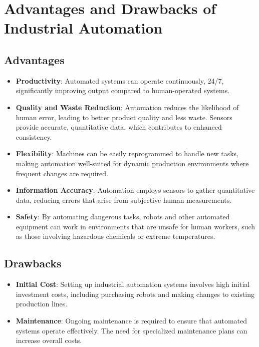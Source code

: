 \documentclass[
  14pt,
  a4paper,
  numbers=noendperiod,
  headinclude=true,
  footinclude=true,
  DIV=calc]{scrreprt}
\providecommand{\tightlist}{%
  \setlength{\itemsep}{0pt}\setlength{\parskip}{0pt}}\usepackage{longtable,booktabs,array}
\begin{document}
\section{Advantages and Drawbacks of Industrial
Automation}\label{advantages-and-drawbacks-of-industrial-automation}

\subsection{Advantages}\label{advantages}

\begin{itemize}
\tightlist
\item
  \textbf{Productivity}: Automated systems can operate continuously,
  24/7, significantly improving output compared to human-operated
  systems.
\item
  \textbf{Quality and Waste Reduction}: Automation reduces the
  likelihood of human error, leading to better product quality and less
  waste. Sensors provide accurate, quantitative data, which contributes
  to enhanced consistency.
\item
  \textbf{Flexibility}: Machines can be easily reprogrammed to handle
  new tasks, making automation well-suited for dynamic production
  environments where frequent changes are required.
\item
  \textbf{Information Accuracy}: Automation employs sensors to gather
  quantitative data, reducing errors that arise from subjective human
  measurements.
\item
  \textbf{Safety}: By automating dangerous tasks, robots and other
  automated equipment can work in environments that are unsafe for human
  workers, such as those involving hazardous chemicals or extreme
  temperatures.
\end{itemize}

\subsection{Drawbacks}\label{drawbacks}

\begin{itemize}
\tightlist
\item
  \textbf{Initial Cost}: Setting up industrial automation systems
  involves high initial investment costs, including purchasing robots
  and making changes to existing production lines.
\item
  \textbf{Maintenance}: Ongoing maintenance is required to ensure that
  automated systems operate effectively. The need for specialized
  maintenance plans can increase overall costs.
\end{itemize}
\end{document}
